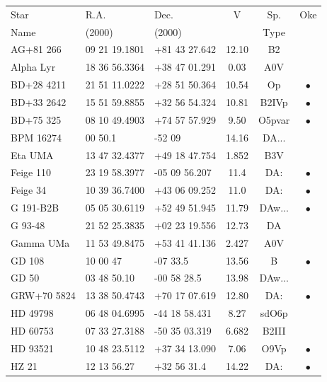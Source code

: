 \documentclass[11pt,twoside]{article}
\begin{document}
\begin{table}[htbp]

\begin{center}
\begin{tabular}{lllccc}
Star        &      R.A.     &      Dec.     &     V   &  Sp.   & Oke \\
Name        &    (2000)     &    (2000)     &         & Type   & \\ \hline
AG+81 266   & 09 21 19.1801 & +81 43 27.642 &  12.10  & B2     &   \\
Alpha Lyr   & 18 36 56.3364 & +38 47 01.291 &   0.03  & A0V    &   \\
BD+28 4211  & 21 51 11.0222 & +28 51 50.364 &  10.54  & Op     & $\bullet$ \\
BD+33 2642  & 15 51 59.8855 & +32 56 54.324 &  10.81  & B2IVp  & $\bullet$ \\
BD+75 325   & 08 10 49.4903 & +74 57 57.929 &   9.50  & O5pvar & $\bullet$ \\
BPM 16274   & 00 50.1       & -52 09        &  14.16  & DA...  &   \\
Eta UMA     & 13 47 32.4377 & +49 18 47.754 &   1.852 & B3V    &   \\
Feige 110   & 23 19 58.3977 & -05 09 56.207 &  11.4   & DA:    & $\bullet$ \\
Feige 34    & 10 39 36.7400 & +43 06 09.252 &  11.0   & DA:    & $\bullet$ \\
G 191-B2B   & 05 05 30.6119 & +52 49 51.945 &  11.79  & DAw... & $\bullet$ \\
G 93-48     & 21 52 25.3835 & +02 23 19.556 &  12.73  & DA     &   \\
Gamma UMa   & 11 53 49.8475 & +53 41 41.136 &   2.427 & A0V    &   \\
GD 108      & 10 00 47      & -07 33.5      &  13.56  & B      & $\bullet$ \\
GD 50       & 03 48 50.10   & -00 58 28.5   &  13.98  & DAw... &   \\
GRW+70 5824 & 13 38 50.4743 & +70 17 07.619 &  12.80  & DA:    & $\bullet$ \\
HD 49798    & 06 48 04.6995 & -44 18 58.431 &   8.27  & sdO6p  &   \\
HD 60753    & 07 33 27.3188 & -50 35 03.319 &   6.682 & B2III  &   \\
HD 93521    & 10 48 23.5112 & +37 34 13.090 &   7.06  & O9Vp   & $\bullet$ \\
HZ 21       & 12 13 56.27   & +32 56 31.4   &  14.22  & DA:    & $\bullet$ \\

\end{tabular}
\end{center}
\end{table}
\end{document}
